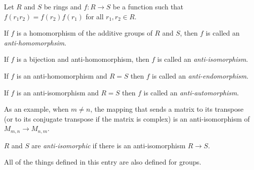 \documentclass[12pt]{article}
\begin{document}
Let $R$ and $S$ be rings and $f: R\longrightarrow S$ be a function such 
that $f(r_{1}r_{2}) = f(r_{2})f(r_{1})$ for all $r_{1}, r_{2} \in R$.


If $f$ is a homomorphism of the additive groups of $R$ and $S$,
then $f$ is called an {\it anti-homomorphsim}.

If $f$ is a bijection and anti-homomorphism,
then $f$ is called an {\it anti-isomorphism}.

If $f$ is an anti-homomorphism and $R=S$
then $f$ is called an {\it anti-endomorphism}.

If $f$ is an anti-isomorphism and $R=S$
then $f$ is called an {\it anti-automorphism}.


As an example, when $m \neq n$, the mapping that sends a matrix to its transpose
(or to its conjugate transpose if the matrix is complex) is an anti-isomorphism
of $M_{m,n} \to M_{n,m}$. 


$R$ and $S$ are \emph{anti-isomorphic} if there is an anti-isomorphism $R \to S$.

All of the things defined in this entry are also defined for groups.



\end{document}
